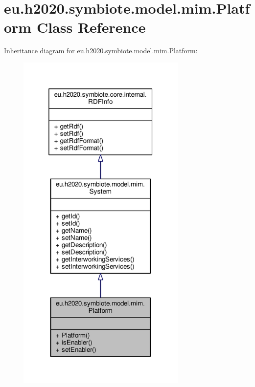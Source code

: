 \hypertarget{classeu_1_1h2020_1_1symbiote_1_1model_1_1mim_1_1Platform}{}\section{eu.\+h2020.\+symbiote.\+model.\+mim.\+Platform Class Reference}
\label{classeu_1_1h2020_1_1symbiote_1_1model_1_1mim_1_1Platform}


Inheritance diagram for eu.\+h2020.\+symbiote.\+model.\+mim.\+Platform\+:
\nopagebreak
\begin{figure}[H]
\begin{center}
\leavevmode
\includegraphics[width=236pt]{classeu_1_1h2020_1_1symbiote_1_1model_1_1mim_1_1Platform__inherit__graph}
\end{center}
\end{figure}


